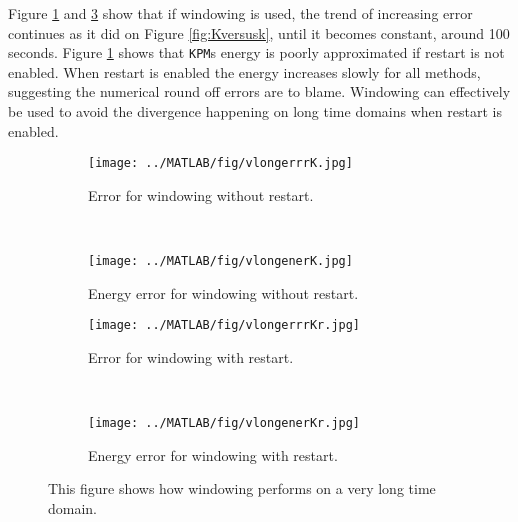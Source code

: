 \noindent Figure \ref{fig:vlongerrrK} and \ref{fig:vlongerrrKr} show that if windowing is used, the trend of increasing error continues as it did on Figure \ref{fig:Kversusk}, until it becomes constant, around 100 seconds. Figure \ref{fig:vlongerrrK} shows that \texttt{KPM}s energy is poorly approximated if restart is not enabled. When restart is enabled the energy increases slowly for all methods, suggesting the numerical round off errors are to blame. Windowing can effectively be used to avoid the divergence happening on long time domains when restart is enabled.

\begin{figure}[H]
        \centering
		\begin{subfigure}[b]{0.3\textwidth}
                \texttt{[image: ../MATLAB/fig/vlongerrrK.jpg]}
                \caption{ Error for windowing without restart. }
                \label{fig:vlongerrrK}
        \end{subfigure}
        ~
		\begin{subfigure}[b]{0.3\textwidth}
                \texttt{[image: ../MATLAB/fig/vlongenerK.jpg]}
                \caption{ Energy error for windowing without restart. }
                \label{fig:vlongenerK}
        \end{subfigure}             
        
        	\begin{subfigure}[b]{0.3\textwidth}
                \texttt{[image: ../MATLAB/fig/vlongerrrKr.jpg]}
                \caption{ Error for windowing with restart. }
                \label{fig:vlongerrrKr}
        \end{subfigure}
        ~
		\begin{subfigure}[b]{0.3\textwidth}
                \texttt{[image: ../MATLAB/fig/vlongenerKr.jpg]}
                \caption{ Energy error for windowing with restart. }
                \label{fig:vlongenerKr}
        \end{subfigure}      
        \caption{  This figure shows how windowing performs on a very long time domain. }
        \label{fig:windowingc}
\end{figure}


%		

